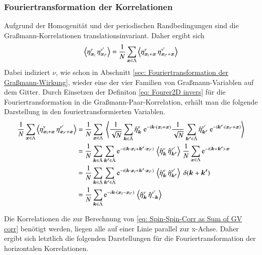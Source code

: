 \subsubsection{Fouriertransformation der Korrelationen}
Aufgrund der Homogenität und der periodischen Randbedingungen sind die Graßmann-Korrelationen translationsinvariant. Daher ergibt sich 
\begin{equation} \label{eq: gv_multi_translation}
\left\langle \eta_{\bm{x}_l}^{\nu}\, \eta_{\bm{x}_{l'}}^{\nu'}  \right\rangle = \frac{1}{N} \sum_{\bm{x} \in \Lambda} \left\langle \eta_{\bm{x}_l + \bm{x}}^{\nu} \,\eta_{\bm{x}_{l'} + \bm{x}}^{\nu'}  \right\rangle
\end{equation}
Dabei indiziert $\nu$, wie schon in Abschnitt \ref{sec: Fouriertransformation der Graßmann-Wirkung}, wieder eine der vier Familien von Graßmann-Variablen auf dem Gitter. 
\noindent Durch Einsetzen der Definiton \eqref{eq: Fourer2D invers} für die Fouriertransformation in die Graßmann-Paar-Korrelation, erhält man die folgende Darstellung in den fouriertransformierten Variablen.
\begin{align} \label{eq: ft_gv_pair_corr}
\frac{1}{N} \sum_{\bm{x} \in \Lambda} \left\langle \eta_{\bm{x}_l + \bm{x}}^{\nu} \,\eta_{\bm{x}_{l'} + \bm{x}}^{\nu'}  \right\rangle
& = \frac{1}{N} \sum_{\bm{x} \in \Lambda} \; \left\langle \frac{1}{\sqrt{N}} \sum_{\bm{k} \in \bar{\Lambda}} \hat{\eta}_{\bm{k}}^{\nu}\; \mathrm{e}^{-i \bm{k} \cdot (\bm{x}_l + \bm{x})} \frac{1}{\sqrt{N}} \sum_{\bm{k'} \in \bar{\Lambda}} \hat{\eta}_{\bm{k'}}^{\nu'}\; \mathrm{e}^{-i  \bm{k'} \cdot (\bm{x}_{l'}+\bm{x})} \right\rangle \nonumber \\
&  = \frac{1}{N} \sum_{\bm{k} \in \bar{\Lambda}} \sum_{\bm{k'} \in \bar{\Lambda}} \mathrm{e}^{-i  (\bm{k} \cdot \bm{x}_l + \bm{k'} \cdot \bm{x}_{l'})} \, \left\langle \hat{\eta}_{\bm{k}}^{\nu}\, \hat{\eta}_{\bm{k'}}^{\nu'} \right\rangle \, \frac{1}{N} \sum_{\bm{x} \in \Lambda} \mathrm{e}^{-i (\bm{k} + \bm{k'})\cdot \bm{x} } \nonumber \\ 
&  = \frac{1}{N} \sum_{\bm{k} \in \bar{\Lambda}} \sum_{\bm{k'} \in \bar{\Lambda}} \mathrm{e}^{-i  (\bm{k} \cdot \bm{x}_l + \bm{k'} \cdot \bm{x}_{l'})} \, \left\langle \hat{\eta}_{\bm{k}}^{\nu} \, \hat{\eta}_{\bm{k'}}^{\nu'} \right\rangle \; \delta(\bm{k} + \bm{k'}) \nonumber \\
& = \frac{1}{N} \sum_{\bm{k} \in \bar{\Lambda}}  \mathrm{e}^{-i  \bm{k} \cdot (\bm{x}_l - \bm{x}_{l'})} \,\left\langle \hat{\eta}_{\bm{k}}^{\nu}\, \hat{\eta}_{-\bm{k}}^{\nu'} \right\rangle \nonumber
\end{align}

\noindent Die Korrelationen die zur Berechnung von \eqref{eq: Spin-Spin-Corr as Sum of GV corr} benötigt werden, liegen alle auf einer Linie parallel zur x-Achse. Daher ergibt sich letztlich die folgenden Darstellungen für die Fouriertransformation der horizontalen Korrelationen.

